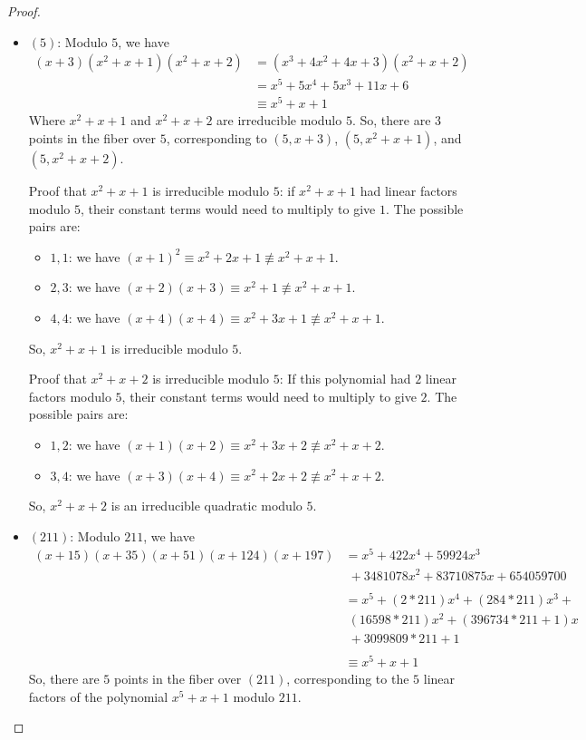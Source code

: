 \documentclass[12pt]{article}
\theoremstyle{definition}
\newenvironment{problem}[2][Problem]{\begin{trivlist}
\item[\hskip \labelsep {\bfseries #1}\hskip \labelsep {\bfseries #2.}]}{\end{trivlist}}
\begin{document}
\begin{problem}{2}
\begin{proof}
\begin{itemize}
			\item $(5)$: Modulo $5$, we have 
				\begin{align*}
					(x + 3) (x^2 + x + 1) (x^2 + x + 2) &= (x^3 + 4x^2 + 4x + 3)(x^2 + x + 2)\\
					&= x^5 + 5x^4 + 5x^3 + 11x + 6\\
					&\equiv x^5 + x + 1
				\end{align*}
				Where $x^2 + x + 1$ and $x^2 + x + 2$ are irreducible modulo $5$. So, there are $3$ points in the fiber over $5$, corresponding to $(5, x+3)$, $(5, x^2 + x + 1)$, and $(5, x^2 + x + 2)$.
				\par Proof that $x^2 + x + 1$ is irreducible modulo $5$: if $x^2 + x + 1$ had linear factors modulo $5$, their constant terms would need to multiply to give $1$. The possible pairs are:
				\begin{itemize}
					\item $1, 1$: we have $(x+1)^2 \equiv x^2 + 2x + 1 \not\equiv x^2 + x + 1$.
					\item $2, 3$: we have $(x+2)(x+3) \equiv x^2 + 1 \not\equiv x^2 + x + 1$.
					\item $4, 4$: we have $(x+4)(x+4) \equiv x^2 + 3x + 1 \not\equiv x^2 + x + 1$.
				\end{itemize}
				So, $x^2 + x + 1$ is irreducible modulo $5$.
				\par Proof that $x^2 + x + 2$ is irreducible modulo $5$: If this polynomial had $2$ linear factors modulo $5$, their constant terms would need to multiply to give $2$. The possible pairs are:
				\begin{itemize}
					\item $1, 2$: we have $(x+1)(x+2)\equiv x^2 + 3x + 2 \not\equiv x^2 + x + 2$.
					\item $3, 4$: we have $(x+3)(x+4) \equiv x^2 + 2x + 2 \not\equiv x^2 +x +2$. 
				\end{itemize}
				So, $x^2 + x + 2$ is an irreducible quadratic modulo $5$.
			\item $(211)$: Modulo $211$, we have
				\begin{align*}
					(x + 15) (x + 35) (x + 51) (x + 124) (x + 197) &= x^5 + 422 x^4 + 59924 x^3 \\&\;+ 3481078 x^2 + 83710875 x + 654059700 \\
					&\;\\
					&= x^5 + (2 * 211)x^4 + (284 * 211)x^3 + \\&\;(16598 * 211)x^2 + (396734 * 211 + 1)x \\&\;+ 3099809 * 211 + 1 \\&\;\\
					&\equiv x^5 + x + 1
				\end{align*}
				So, there are $5$ points in the fiber over $(211)$, corresponding to the $5$ linear factors of the polynomial $x^5 + x + 1$ modulo $211$.
		\end{itemize}
	\end{proof}
\end{problem}
\end{document}
